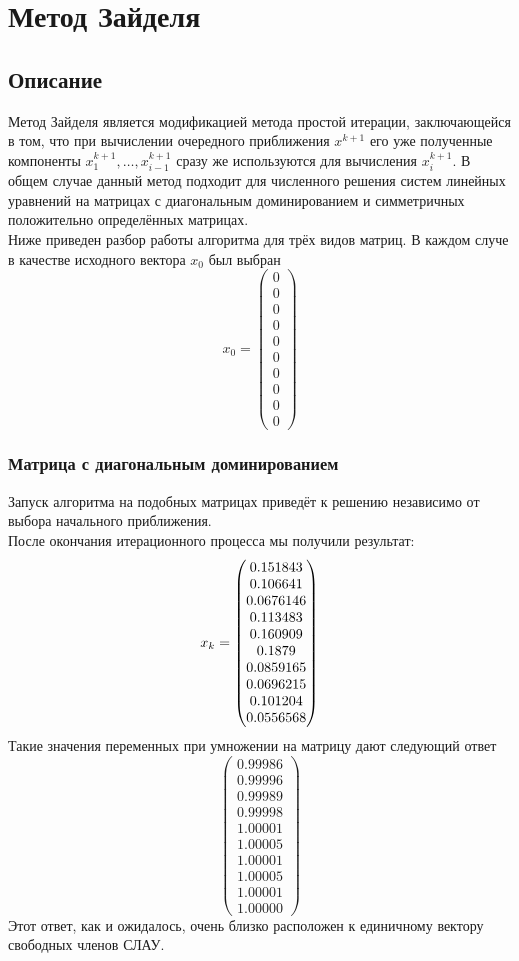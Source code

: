 \documentclass[../../report.tex]{subfiles}
\begin{document}
\chapter{Метод Зайделя}

\section{Описание}
Метод Зайделя является модификацией метода простой итерации, заключающейся в том, что при вычислении 
очередного приближения $x^{k+1}$ его уже полученные компоненты $x_1^{k+1},\dots,x_{i-1}^{k+1}$ сразу 
же используются для вычисления $x_i^{k+1}$. В общем случае данный метод подходит для численного решения 
систем линейных уравнений на матрицах с диагональным доминированием и симметричных положительно определённых матрицах. \\
Ниже приведен разбор работы алгоритма для трёх видов матриц. В каждом случе в качестве исходного вектора $x_0$ был выбран 
\[
x_0 = 
\begin{pmatrix} 
  0 \\ 
  0 \\ 
  0 \\ 
  0 \\ 
  0 \\ 
  0 \\ 
  0 \\ 
  0 \\ 
  0 \\ 
  0 
\end{pmatrix}
\]

\subsection{Матрица с диагональным доминированием}
Запуск алгоритма на подобных матрицах приведёт к 
решению независимо от выбора начального приближения. \\
После окончания итерационного процесса мы получили результат:
\[
x_k = \begin{pmatrix} 0.151843 \\ 0.106641 \\ 0.0676146 \\ 0.113483 \\ 0.160909 \\ 0.1879 \\ 0.0859165 \\ 0.0696215 \\ 0.101204 \\ 0.0556568 \end{pmatrix}
\]
Такие значения переменных при умножении на матрицу дают следующий ответ
\[
\begin{pmatrix}
  0.99986 \\
  0.99996 \\
  0.99989 \\
  0.99998 \\
  1.00001 \\
  1.00005 \\
  1.00001 \\
  1.00005 \\
  1.00001 \\
  1.00000
\end{pmatrix}
\]
Этот ответ, как и ожидалось, очень близко расположен к единичному вектору свободных членов СЛАУ.
\end{document}
